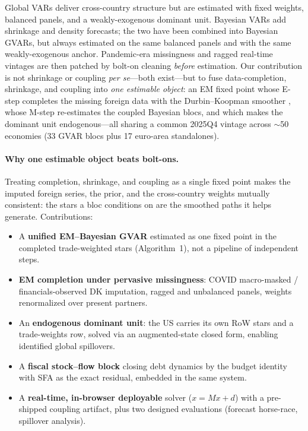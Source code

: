 \documentclass[11pt]{article}
\begin{document}
Global VARs \citep{PesaranSchuermannWeiner2004,DeesDiMauroPesaranSmith2007,ChudikPesaran2016}
deliver cross-country structure but are estimated with fixed weights, balanced panels, and a
weakly-exogenous dominant unit. Bayesian VARs
\citep{Litterman1986,DoanLittermanSims1984,Giannone2015,GiannoneLenzaPrimiceri2019} add shrinkage
and density forecasts; the two have been combined into Bayesian GVARs, but always estimated on the
same balanced panels and with the same weakly-exogenous anchor. Pandemic-era missingness
\citep{LenzaPrimiceri2022,CarrieroClarkMarcellino2015} and ragged real-time vintages
\citep{GiannoneReichlinSmall2008} are then patched by bolt-on cleaning \emph{before} estimation.
Our contribution is not shrinkage or coupling \emph{per se}---both exist---but to fuse data-completion,
shrinkage, and coupling into \emph{one estimable object}: an EM fixed point whose E-step completes the
missing foreign data with the Durbin--Koopman smoother \citep{DurbinKoopman2002,DurbinKoopman2012},
whose M-step re-estimates the coupled Bayesian blocs, and which makes the dominant unit endogenous---all
sharing a common 2025Q4 vintage across $\sim$50 economies (33 GVAR blocs plus 17 euro-area standalones).

\paragraph{Why one estimable object beats bolt-ons.} Treating completion, shrinkage, and coupling
as a single fixed point makes the imputed foreign series, the prior, and the cross-country
weights mutually consistent: the stars a bloc conditions on are the smoothed paths it helps
generate. Contributions:
\begin{itemize}
  \item A \textbf{unified EM--Bayesian GVAR} estimated as one fixed point in the completed
        trade-weighted stars (Algorithm~1), not a pipeline of independent steps.
  \item \textbf{EM completion under pervasive missingness}: COVID macro-masked / financials-observed
        DK imputation, ragged and unbalanced panels, weights renormalized over present partners.
  \item An \textbf{endogenous dominant unit}: the US carries its own RoW stars and a trade-weights
        row, solved via an augmented-state closed form, enabling identified global spillovers.
  \item A \textbf{fiscal stock--flow block} closing debt dynamics by the budget identity with SFA as
        the exact residual, embedded in the same system.
  \item A \textbf{real-time, in-browser deployable} solver ($x{=}Mx{+}d$) with a pre-shipped coupling
        artifact, plus two designed evaluations (forecast horse-race, spillover analysis).
\end{itemize}
\end{document}
